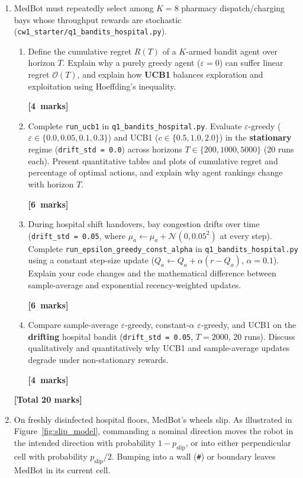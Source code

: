 \documentclass[11pt,a4paper]{article}
\newcommand{\qmarks}[1]{\par\nopagebreak\noindent\hfill\mbox{\textbf{[#1 marks]}}}
\newcommand{\qtotal}[1]{\par\smallskip\noindent\hfill\textbf{[Total #1 marks]}\par\medskip}
\begin{document}
\begin{enumerate}[label=\textbf{\arabic*.}, leftmargin=1.5em, itemsep=0.6em]

\item MedBot must repeatedly select among $K = 8$ pharmacy dispatch/charging bays whose throughput rewards are stochastic (\texttt{cw1\_starter/q1\_bandits\_hospital.py}).
\begin{enumerate}[label=\textbf{\alph*.}, leftmargin=1.6em, itemsep=0.45em]
    \item Define the cumulative regret $R(T)$ of a $K$-armed bandit agent over horizon $T$. Explain why a purely greedy agent ($\varepsilon = 0$) can suffer linear regret $\mathcal{O}(T)$, and explain how \textbf{UCB1} balances exploration and exploitation using Hoeffding's inequality. \qmarks{4}

    \item Complete \texttt{run\_ucb1} in \texttt{q1\_bandits\_hospital.py}. Evaluate $\varepsilon$-greedy ($\varepsilon \in \{0.0, 0.05, 0.1, 0.3\}$) and UCB1 ($c \in \{0.5, 1.0, 2.0\}$) in the \textbf{stationary} regime (\texttt{drift\_std = 0.0}) across horizons $T \in \{200, 1000, 5000\}$ (20 runs each). Present quantitative tables and plots of cumulative regret and percentage of optimal actions, and explain why agent rankings change with horizon $T$. \qmarks{6}

    \item During hospital shift handovers, bay congestion drifts over time (\texttt{drift\_std = 0.05}, where $\mu_a \leftarrow \mu_a + \mathcal{N}(0, 0.05^2)$ at every step). Complete \texttt{run\_epsilon\_greedy\_const\_alpha} in \texttt{q1\_bandits\_hospital.py} using a constant step-size update ($Q_a \leftarrow Q_a + \alpha(r - Q_a)$, $\alpha = 0.1$). Explain your code changes and the mathematical difference between sample-average and exponential recency-weighted updates. \qmarks{6}

    \item Compare sample-average $\varepsilon$-greedy, constant-$\alpha$ $\varepsilon$-greedy, and UCB1 on the \textbf{drifting} hospital bandit (\texttt{drift\_std = 0.05}, $T = 2000$, 20 runs). Discuss qualitatively and quantitatively why UCB1 and sample-average updates degrade under non-stationary rewards. \qmarks{4}
\end{enumerate}
\qtotal{20}

\item On freshly disinfected hospital floors, MedBot's wheels slip. As illustrated in Figure~\ref{fig:slip_model}, commanding a nominal direction moves the robot in the intended direction with probability $1 - p_{\mathrm{slip}}$, or into either perpendicular cell with probability $p_{\mathrm{slip}}/2$. Bumping into a wall (\texttt{\#}) or boundary leaves MedBot in its current cell.


\end{enumerate}
\end{document}
